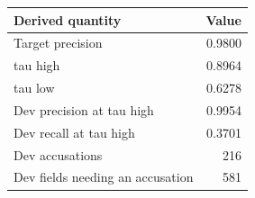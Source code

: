\begingroup\small\setlength{\tabcolsep}{4pt}
\begin{tabular}{lr}
\toprule
\textbf{Derived quantity} & \textbf{Value} \\
\midrule
Target precision & 0.9800 \\  %
tau high & 0.8964 \\  %
tau low & 0.6278 \\  %
Dev precision at tau high & 0.9954 \\  %
Dev recall at tau high & 0.3701 \\  %
Dev accusations & 216 \\  %
Dev fields needing an accusation & 581 \\  %
\bottomrule
\end{tabular}
\endgroup
\par\smallskip{}
